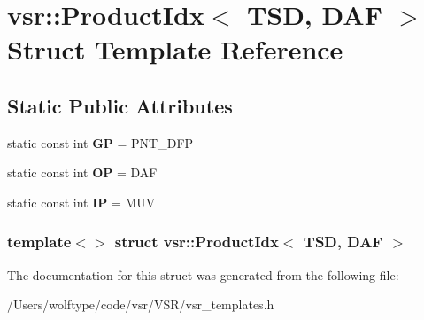 \hypertarget{structvsr_1_1_product_idx_3_01_t_s_d_00_01_d_a_f_01_4}{\section{vsr\-:\-:Product\-Idx$<$ T\-S\-D, D\-A\-F $>$ Struct Template Reference}
\label{structvsr_1_1_product_idx_3_01_t_s_d_00_01_d_a_f_01_4}
}
\subsection*{Static Public Attributes}
\begin{DoxyCompactItemize}
\item 
\hypertarget{structvsr_1_1_product_idx_3_01_t_s_d_00_01_d_a_f_01_4_a4cfb157383ade308ca4b1c2d1b10dd48}{static const int {\bfseries G\-P} = P\-N\-T\-\_\-\-D\-F\-P}\label{structvsr_1_1_product_idx_3_01_t_s_d_00_01_d_a_f_01_4_a4cfb157383ade308ca4b1c2d1b10dd48}

\item 
\hypertarget{structvsr_1_1_product_idx_3_01_t_s_d_00_01_d_a_f_01_4_a4b96aa4ffcc1edd158f8e8cff9547b27}{static const int {\bfseries O\-P} = D\-A\-F}\label{structvsr_1_1_product_idx_3_01_t_s_d_00_01_d_a_f_01_4_a4b96aa4ffcc1edd158f8e8cff9547b27}

\item 
\hypertarget{structvsr_1_1_product_idx_3_01_t_s_d_00_01_d_a_f_01_4_ab0c121203a03ffdb64e1a2d1ab63e49e}{static const int {\bfseries I\-P} = M\-U\-V}\label{structvsr_1_1_product_idx_3_01_t_s_d_00_01_d_a_f_01_4_ab0c121203a03ffdb64e1a2d1ab63e49e}

\end{DoxyCompactItemize}
\subsubsection*{template$<$$>$ struct vsr\-::\-Product\-Idx$<$ T\-S\-D, D\-A\-F $>$}



The documentation for this struct was generated from the following file\-:\begin{DoxyCompactItemize}
\item 
/\-Users/wolftype/code/vsr/\-V\-S\-R/vsr\-\_\-templates.\-h\end{DoxyCompactItemize}
